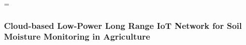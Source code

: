 =\documentclass[12pt, a4paper]{article}
\begin{document}
\subsubsection{Cloud-based Low-Power Long Range IoT Network for Soil Moisture Monitoring in Agriculture}
\end{document}
